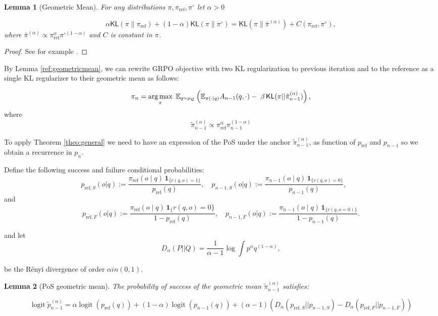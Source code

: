 \documentclass[11pt,reqno]{amsart}
\newtheorem{lemma}{Lemma}
\def\argmax{\operatornamewithlimits{arg\,max}}
\DeclareMathOperator{\logit}{logit}
\begin{document}
\begin{lemma}[Geometric Mean]
\label{lem:two-kl-collapse}
For any distributions $\pi,\pi_{\mathrm{ref}},\pi^{\circ}$ let $\alpha>0$

\[
\alpha \mathsf{KL}(\pi\|\pi_{\mathrm{ref}})+ (1-\alpha)\mathsf{KL}(\pi\|\pi^{\circ})
= \mathsf{KL}(\pi\|\bar\pi^{(\alpha)}) + C(\pi_{\mathrm{ref}},\pi^{\circ}),
\]
where $\bar\pi^{(\alpha)}\propto \pi_{\mathrm{ref}}^{\alpha}\pi^{\circ (1-\alpha)}$ and $C$ is constant in $\pi$.
\label{ref:geometricmean}
\end{lemma}



\begin{proof}
See for example \citep{aminian2025theoreticalanalysisklregularizedrlhf}.
\end{proof}

By Lemma \ref{ref:geometricmean}, we can rewrite GRPO objective with two KL regularization to previous iteration and to the reference as a single KL regularizer to their geometric mean as follows:

 \begin{equation}
\label{eq:mirror-obj}
\pi_{n}=\argmax_{\pi}\; \mathbb{E}_{q\sim \rho_{\mathcal{Q}}} \left(\mathbb{E}_{\pi(\cdot|q)}
 A_{n-1}(q,\cdot)-\;\beta\, \mathsf{KL} (\pi || \tilde{\pi}^{(\alpha)}_{n-1}) \right),
\end{equation}
where 
\[ \tilde{\pi}^{(\alpha)}_{n-1} \propto \pi_{\mathrm{ref}}^{\alpha}\pi^{ (1-\alpha)}_{n-1}\]

To apply Theorem \ref{theo:general} we need to have an expression of the PoS under  the anchor $\tilde{\pi}^{(\alpha)}_{n-1}$, as function of $p_{\mathrm{ref}}$ and $p_{n-1}$ so we obtain a recurrence in $p_n$. 

Define the following success and failure conditional probabilities:
 \[
p_{\mathrm{ref},S}(o|q):=\frac{\pi_{\mathrm{ref}}(o\mid q)\,\mathbf 1_{\{r(q,o)=1\}}}{p_{\mathrm{ref}}(q)},\quad
p_{n-1,S}(o|q):=\frac{\pi_{n-1}(o\mid q)\,\mathbf 1_{\{r(q,o)=0\}}}{p_{n-1}(q)},\qquad \]
and 
\[
p_{\mathrm{ref},F}(o|q):=\frac{\pi_{\mathrm{ref}}(o\mid q)\,\mathbf 1{_\{r(q,o)=0\}}}{1-p_{\mathrm{ref}}(q)},\quad
p_{n-1,F}(o|q):=\frac{\pi_{n-1}(o\mid q)\,\mathbf 1_{\{r(q,o=0)\}}}{1-p_{n-1}(q)}.
\]

and let \[D_{\alpha} (P || Q) = \frac{1}{\alpha-1} \log \int p^\alpha q^{(1-\alpha)},\]

be the Rényi divergence of order $\alpha in (0,1)$.
\begin{lemma} [PoS geometric mean] The probability of success of the geometric mean $\tilde{\pi}^{(\alpha)}_{n-1}$ satisfies: 

\[ \logit  \tilde{p}^{(\alpha)}_{n-1} = \alpha \logit(p_{\mathrm{ref}}(q)) +(1-\alpha) \logit (p_{n-1}(q)) + ( \alpha-1 ) \left(  D_{\alpha}( p_{\mathrm{ref},S}|| p_{n-1,S})  - D_{\alpha}( p_{\mathrm{ref},F}|| p_{n-1,F}  )\right)    \]
\label{lem:posgeom}
\end{lemma}
\end{document}
